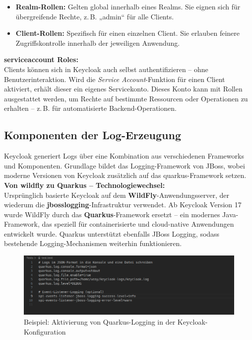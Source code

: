 \documentclass[a4paper,12pt]{article}
\let\footnote=\endnote
\begin{document}
	\begin{itemize}
		\item \textbf{Realm-Rollen:} Gelten global innerhalb eines Realms. Sie eignen sich für übergreifende Rechte, z.\,B. „admin“ für alle Clients.
		\item \textbf{Client-Rollen:} Spezifisch für einen einzelnen Client. Sie erlauben feinere Zugriffskontrolle innerhalb der jeweiligen Anwendung.
	\end{itemize}
	
	\vspace{0.5em}
	\textbf{\gls{serviceaccount} Roles:}\\
	Clients können sich in Keycloak auch selbst authentifizieren – ohne Benutzerinteraktion. Wird die \textit{Service Account}-Funktion für einen Client aktiviert, erhält dieser ein eigenes Servicekonto. Dieses Konto kann mit Rollen ausgestattet werden, um Rechte auf bestimmte Ressourcen oder Operationen zu erhalten – z.\,B. für automatisierte Backend-Operationen.
	
	\subsection{Komponenten der Log-Erzeugung}
	Keycloak generiert Logs über eine Kombination aus verschiedenen Frameworks und Komponenten. Grundlage bildet das Logging-Framework von JBoss, wobei moderne Versionen von Keycloak zusätzlich auf das \gls{quarkus}-Framework setzen.
	\vspace{0.5em}
	\textbf{Von \gls{wildfly} zu Quarkus – Technologiewechsel:}\\
	Ursprünglich basierte Keycloak auf dem \textbf{WildFly}-Anwendungsserver\footnote{\url{https://www.wildfly.org/}}, der wiederum die \textbf{\gls{jbosslogging}}-Infrastruktur verwendet. Ab Keycloak Version 17 wurde WildFly durch das \textbf{Quarkus}-Framework ersetzt – ein modernes Java-Framework, das speziell für containerisierte und cloud-native Anwendungen entwickelt wurde. Quarkus unterstützt ebenfalls JBoss Logging, sodass bestehende Logging-Mechanismen weiterhin funktionieren.
	
	\begin{figure}[H]
		\centering
		\includegraphics[width=0.9\linewidth]{screenshot008}
		\caption{Beispiel: Aktivierung von Quarkus-Logging in der Keycloak-Konfiguration}
		\label{fig:screenshot008}
	\end{figure}
	
\end{document}
